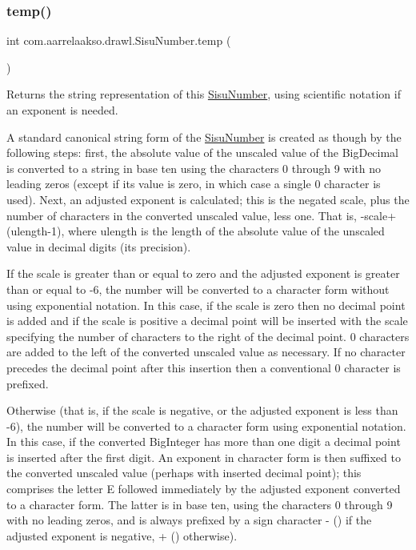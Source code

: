 \subsubsection{\texorpdfstring{temp()}{temp()}}
{\footnotesize\ttfamily int com.\+aarrelaakso.\+drawl.\+Sisu\+Number.\+temp (\begin{DoxyParamCaption}{ }\end{DoxyParamCaption})\hspace{0.3cm}{\ttfamily [private]}}



Returns the string representation of this \hyperlink{classcom_1_1aarrelaakso_1_1drawl_1_1_sisu_number}{Sisu\+Number}, using scientific notation if an exponent is needed. 

A standard canonical string form of the \hyperlink{classcom_1_1aarrelaakso_1_1drawl_1_1_sisu_number}{Sisu\+Number} is created as though by the following steps\+: first, the absolute value of the unscaled value of the Big\+Decimal is converted to a string in base ten using the characters \textquotesingle{}0\textquotesingle{} through \textquotesingle{}9\textquotesingle{} with no leading zeros (except if its value is zero, in which case a single \textquotesingle{}0\textquotesingle{} character is used). Next, an adjusted exponent is calculated; this is the negated scale, plus the number of characters in the converted unscaled value, less one. That is, -\/scale+(ulength-\/1), where ulength is the length of the absolute value of the unscaled value in decimal digits (its precision). 

If the scale is greater than or equal to zero and the adjusted exponent is greater than or equal to -\/6, the number will be converted to a character form without using exponential notation. In this case, if the scale is zero then no decimal point is added and if the scale is positive a decimal point will be inserted with the scale specifying the number of characters to the right of the decimal point. \textquotesingle{}0\textquotesingle{} characters are added to the left of the converted unscaled value as necessary. If no character precedes the decimal point after this insertion then a conventional \textquotesingle{}0\textquotesingle{} character is prefixed. 

Otherwise (that is, if the scale is negative, or the adjusted exponent is less than -\/6), the number will be converted to a character form using exponential notation. In this case, if the converted Big\+Integer has more than one digit a decimal point is inserted after the first digit. An exponent in character form is then suffixed to the converted unscaled value (perhaps with inserted decimal point); this comprises the letter \textquotesingle{}E\textquotesingle{} followed immediately by the adjusted exponent converted to a character form. The latter is in base ten, using the characters \textquotesingle{}0\textquotesingle{} through \textquotesingle{}9\textquotesingle{} with no leading zeros, and is always prefixed by a sign character \textquotesingle{}-\/\textquotesingle{} (\textquotesingle{}\textquotesingle{}) if the adjusted exponent is negative, \textquotesingle{}+\textquotesingle{} (\textquotesingle{}\textquotesingle{}) otherwise). 

